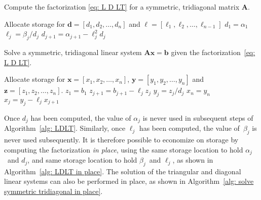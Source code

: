 \begin{algorithm}
\caption{Compute the factorization \eqref{eq: L D LT} for a symmetric, 
tridiagonal matrix $\boldsymbol{A}$.}
\label{alg: LDLT}
\begin{algorithmic}
\Statex
{}
\State Allocate storage for $\boldsymbol{d}=[d_1,d_2,\ldots, d_n]$ and
$\boldsymbol{\ell}=[\ell_1,\ell_2,\ldots,\ell_{n-1}]$
\State $d_1=\alpha_1$
\State $\ell_j=\beta_j/d_j$
\State $d_{j+1}=\alpha_{j+1}-\ell_j^2d_j$
\EndFor
\State{}
\EndFunction
\end{algorithmic}
\end{algorithm}

\begin{algorithm}
\caption{Solve a symmetric, tridiagonal linear system 
$\boldsymbol{A}\boldsymbol{x}=\boldsymbol{b}$ given the 
factorization~\eqref{eq: L D LT}.}
\label{alg: solve symmetric tridiagonal}
\begin{algorithmic}
\Statex
{}
\State Allocate storage for $\boldsymbol{x}=[x_1,x_2,\ldots,x_n]$,
$\boldsymbol{y}=[y_1,y_2,\ldots,y_n]$ and $\boldsymbol{z}=[z_1,z_2,\ldots,z_n]$.
\State $z_1=b_1$
\State $z_{j+1}=b_{j+1}-\ell_jz_j$
\EndFor
{}
\State $y_j=z_j/d_j$
\EndFor
\State $x_n=y_n$
\State $x_j=y_j-\ell_jx_{j+1}$
\EndFor
\State{}
\EndFunction
\end{algorithmic}
\end{algorithm}

Once $d_j$ has been computed, the value of $\alpha_j$ is never used in 
subsequent steps of Algorithm~\ref{alg: LDLT}. Similarly, once $\ell_j$ has been 
computed, the value of~$\beta_j$ is never used subsequently.  It is therefore 
possible to economize on storage by computing the factorization 
\emph{in place}, using the same storage location to hold $\alpha_j$~and $d_j$,
and same storage location to hold $\beta_j$~and $\ell_j$, as shown in 
Algorithm~\ref{alg: LDLT in place}.  The solution of the triangular and 
diagonal linear systems can also be performed in place, as shown in 
Algorithm~\ref{alg: solve symmetric tridiagonal in place}.

